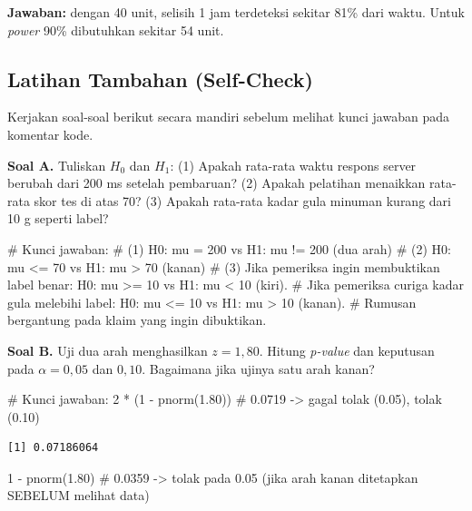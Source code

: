\documentclass[
  indonesian,
  letterpaper,
]{book}
\newenvironment{Shaded}{\begin{snugshade}}{\end{snugshade}}
\newcommand{\CommentTok}[1]{\textcolor[rgb]{0.37,0.37,0.37}{#1}}
\newcommand{\DecValTok}[1]{\textcolor[rgb]{0.68,0.00,0.00}{#1}}
\newcommand{\FloatTok}[1]{\textcolor[rgb]{0.68,0.00,0.00}{#1}}
\newcommand{\FunctionTok}[1]{\textcolor[rgb]{0.28,0.35,0.67}{#1}}
\newcommand{\NormalTok}[1]{\textcolor[rgb]{0.00,0.23,0.31}{#1}}
\newcommand{\SpecialCharTok}[1]{\textcolor[rgb]{0.37,0.37,0.37}{#1}}
\begin{document}
\textbf{Jawaban:} dengan 40 unit, selisih 1 jam terdeteksi sekitar 81\%
dari waktu. Untuk \emph{power} 90\% dibutuhkan sekitar 54 unit.

\subsection{Latihan Tambahan
(Self-Check)}\label{latihan-tambahan-self-check-1}

Kerjakan soal-soal berikut secara mandiri sebelum melihat kunci jawaban
pada komentar kode.

\textbf{Soal A.} Tuliskan \(H_0\) dan \(H_1\): (1) Apakah rata-rata
waktu respons server berubah dari 200 ms setelah pembaruan? (2) Apakah
pelatihan menaikkan rata-rata skor tes di atas 70? (3) Apakah rata-rata
kadar gula minuman kurang dari 10 g seperti label?

\begin{Shaded}
\begin{Highlighting}[]
\CommentTok{\# Kunci jawaban:}
\CommentTok{\# (1) H0: mu = 200   vs H1: mu != 200  (dua arah)}
\CommentTok{\# (2) H0: mu \textless{}= 70   vs H1: mu \textgreater{} 70    (kanan)}
\CommentTok{\# (3) Jika pemeriksa ingin membuktikan label benar: H0: mu \textgreater{}= 10 vs H1: mu \textless{} 10 (kiri).}
\CommentTok{\#     Jika pemeriksa curiga kadar gula melebihi label: H0: mu \textless{}= 10 vs H1: mu \textgreater{} 10 (kanan).}
\CommentTok{\#     Rumusan bergantung pada klaim yang ingin dibuktikan.}
\end{Highlighting}
\end{Shaded}

\textbf{Soal B.} Uji dua arah menghasilkan \(z = 1{,}80\). Hitung
\emph{p-value} dan keputusan pada \(\alpha = 0{,}05\) dan \(0{,}10\).
Bagaimana jika ujinya satu arah kanan?

\begin{Shaded}
\begin{Highlighting}[]
\CommentTok{\# Kunci jawaban:}
\DecValTok{2} \SpecialCharTok{*}\NormalTok{ (}\DecValTok{1} \SpecialCharTok{{-}} \FunctionTok{pnorm}\NormalTok{(}\FloatTok{1.80}\NormalTok{))   }\CommentTok{\# 0.0719 {-}\textgreater{} gagal tolak (0.05), tolak (0.10)}
\end{Highlighting}
\end{Shaded}

\begin{verbatim}
[1] 0.07186064
\end{verbatim}

\begin{Shaded}
\begin{Highlighting}[]
\DecValTok{1} \SpecialCharTok{{-}} \FunctionTok{pnorm}\NormalTok{(}\FloatTok{1.80}\NormalTok{)         }\CommentTok{\# 0.0359 {-}\textgreater{} tolak pada 0.05 (jika arah kanan ditetapkan SEBELUM melihat data)}
\end{Highlighting}
\end{Shaded}
\end{document}
